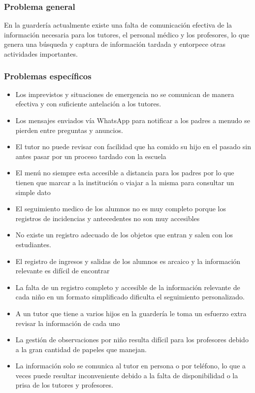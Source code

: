 \documentclass{article}
\begin{document}
\subsubsection{Problema general}

En la guardería actualmente existe una falta de comunicación efectiva de la información necesaria para los tutores, el personal médico y los profesores, lo que genera una búsqueda y captura de información tardada y entorpece otras actividades importantes.

\subsubsection{Problemas específicos}
\begin{itemize}
	\item Los imprevistos y situaciones de emergencia no se comunican de manera efectiva y con suficiente antelación a los tutores.
	\item Los mensajes enviados vía WhatsApp para notificar a los padres a menudo se pierden entre preguntas y anuncios.
	\item El tutor no puede revisar con facilidad que ha comido su hijo en el pasado sin antes pasar por un proceso tardado con la escuela
	\item El menú no siempre esta accesible a distancia para los padres por lo que tienen que marcar a la institución o viajar a la misma para consultar un simple dato
	\item El seguimiento medico de los alumnos no es muy completo porque los registros de  incidencias y antecedentes no son muy accesibles
	\item No existe un registro adecuado de los objetos que entran y salen con los estudiantes.
	\item El registro de ingresos y salidas de los alumnos es arcaico y la información relevante es difícil de encontrar
	\item La falta de un registro completo y accesible de la información relevante de cada niño en un formato simplificado dificulta el seguimiento personalizado.
	\item A un tutor que tiene a varios hijos en la guardería le toma un esfuerzo extra revisar la información de cada uno
	\item La gestión de observaciones por niño resulta difícil para los profesores debido a la gran cantidad de papeles que manejan.
	\item La información solo se comunica al tutor en persona o por teléfono, lo que a veces puede resultar inconveniente debido a la falta de disponibilidad o la prisa de los tutores y profesores.

\end{itemize}
\end{document}
